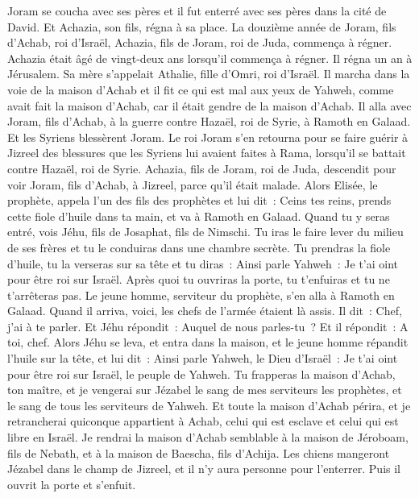 \begin{multicols}{2}
Joram se coucha avec ses pères et il fut enterré avec ses pères dans la cité de David. Et Achazia, son fils, régna à sa place.
La douzième année de Joram, fils d'Achab, roi d'Israël, Achazia, fils de Joram, roi de Juda, commença à régner.
Achazia était âgé de vingt-deux ans lorsqu'il commença à régner. Il régna un an à Jérusalem. Sa mère s'appelait Athalie, fille d'Omri, roi d'Israël.
Il marcha dans la voie de la maison d'Achab et il fit ce qui est mal aux yeux de Yahweh, comme avait fait la maison d'Achab, car il était gendre de la maison d'Achab.
Il alla avec Joram, fils d'Achab, à la guerre contre Hazaël, roi de Syrie, à Ramoth en Galaad. Et les Syriens blessèrent Joram.
Le roi Joram s'en retourna pour se faire guérir à Jizreel des blessures que les Syriens lui avaient faites à Rama, lorsqu'il se battait contre Hazaël, roi de Syrie. Achazia, fils de Joram, roi de Juda, descendit pour voir Joram, fils d'Achab, à Jizreel, parce qu'il était malade.
\VerseOne{}Alors Elisée, le prophète, appela l'un des fils des prophètes et lui dit~: Ceins tes reins, prends cette fiole d'huile dans ta main, et va à Ramoth en Galaad.
Quand tu y seras entré, vois Jéhu, fils de Josaphat, fils de Nimschi. Tu iras le faire lever du milieu de ses frères et tu le conduiras dans une chambre secrète.
Tu prendras la fiole d'huile, tu la verseras sur sa tête et tu diras~: Ainsi parle Yahweh~: Je t'ai oint pour être roi sur Israël. Après quoi tu ouvriras la porte, tu t'enfuiras et tu ne t'arrêteras pas.
Le jeune homme, serviteur du prophète, s'en alla à Ramoth en Galaad.
Quand il arriva, voici, les chefs de l'armée étaient là assis. Il dit~: Chef, j'ai à te parler. Et Jéhu répondit~: Auquel de nous parles-tu~? Et il répondit~: A toi, chef.
Alors Jéhu se leva, et entra dans la maison, et le jeune homme répandit l'huile sur la tête, et lui dit~: Ainsi parle Yahweh, le Dieu d'Israël~: Je t'ai oint pour être roi sur Israël, le peuple de Yahweh.
Tu frapperas la maison d'Achab, ton maître, et je vengerai sur Jézabel le sang de mes serviteurs les prophètes, et le sang de tous les serviteurs de Yahweh.
Et toute la maison d'Achab périra, et je retrancherai quiconque appartient à Achab, celui qui est esclave et celui qui est libre en Israël.
Je rendrai la maison d'Achab semblable à la maison de Jéroboam, fils de Nebath, et à la maison de Baescha, fils d'Achija.
Les chiens mangeront Jézabel dans le champ de Jizreel, et il n'y aura personne pour l'enterrer. Puis il ouvrit la porte et s'enfuit.

\end{multicols}
